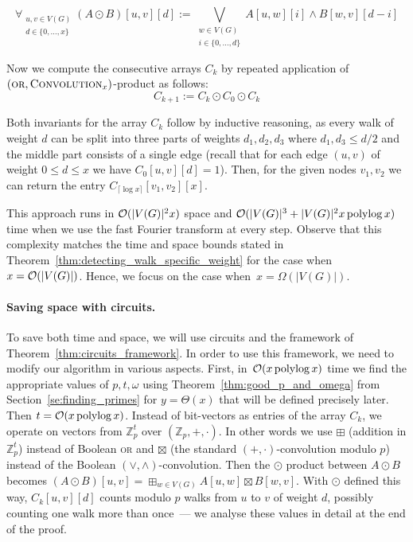 $$\forall_{\substack{u,v\in V(G)\\ d\in\{0,\ldots,x\}}} (A\odot B)[u,v][d]:=\bigvee_{\substack{w\in V(G) \\  i\in \{0,\ldots,d\}}} A[u,w][i] \wedge B[w,v][d-i]$$

\noindent Now we compute the consecutive arrays $C_k$ by repeated application of $(\textsc{or},\textsc{Convolution}_x)$-product as follows:
$$C_{k+1}:=C_k \odot C_0 \odot C_k$$

Both invariants for the array $C_k$ follow by inductive reasoning, as every walk of weight $d$ can be split into three parts of weights $d_1,d_2,d_3$ where $d_1,d_3\leq d/2$ and the middle part consists of a single edge (recall that for each edge $(u,v)$ of weight $0 \le d \le x$ we have $C_0[u,v][d] = 1$).
Then, for the given nodes $v_1,v_2$ we can return the entry $C_{\lceil \log x \rceil}[v_1,v_2][x]$.

This approach runs in $\mathcal{O}(|V(G)|^2 x)$ space and $\mathcal{O}(|V(G)|^3+|V(G)|^2 x \operatorname{polylog} x)$ time when we use the fast Fourier transform at every step.
Observe that this complexity matches the time and space bounds stated in Theorem~\ref{thm:detecting_walk_specific_weight} for the case when $x=\mathcal{O}(|V(G)|)$.
Hence, we focus on the case when~$x=\Omega(|V(G)|)$.

\paragraph{Saving space with circuits.} To save both time and space, we will use circuits and the framework of Theorem~\ref{thm:circuits_framework}.
In order to use this framework, we need to modify our algorithm in various aspects.
First, in~$\mathcal{O}(x\operatorname{polylog} x)$ time we find the appropriate values of $p,t,\omega$ using Theorem~\ref{thm:good_p_and_omega} from Section~\ref{se:finding_primes} for $y=\Theta(x)$ that will be defined precisely later.
Then $t=\mathcal{O}(x\operatorname{polylog} x)$.
Instead of bit-vectors as entries of the array $C_k$, we operate on vectors from $\mathbb{Z}_p^t$ over $(\mathbb{Z}_p,+,\cdot)$.
In other words we use $\boxplus$ (addition in $\mathbb{Z}_p^t$) instead of Boolean \textsc{or} and $\boxtimes$ (the standard $(+,\cdot)$-convolution modulo $p$) instead of the Boolean $(\vee,\wedge)$-convolution.
Then the $\odot$ product between $A\odot B$ becomes $(A\odot B)[u,v]=\boxplus_{w\in V(G)} A[u,w] \boxtimes B[w,v]$.
With $\odot$ defined this way, $C_k[u,v][d]$ counts modulo $p$ walks from $u$ to $v$ of weight $d$, possibly counting one walk more than once~--- we analyse these values in detail at the end of the proof.


